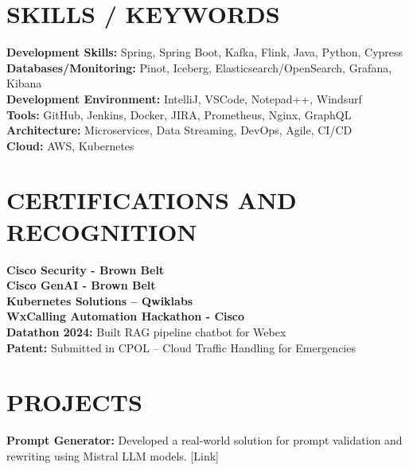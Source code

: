 \documentclass[margin,line]{resume}
\begin{document}
\begin{resume}
\section{\mysidestyle \textbf{\large{S}\small{KILLS} / \large{K}\small{EYWORDS}}}

\textbf{Development Skills:} Spring, Spring Boot, Kafka, Flink, Java, Python, Cypress\\
\textbf{Databases/Monitoring:} Pinot, Iceberg, Elasticsearch/OpenSearch, Grafana, Kibana\\
\textbf{Development Environment:} IntelliJ, VSCode, Notepad++, Windsurf\\
\textbf{Tools:} GitHub, Jenkins, Docker, JIRA, Prometheus, Nginx, GraphQL\\
\textbf{Architecture:} Microservices, Data Streaming, DevOps, Agile, CI/CD\\
\textbf{Cloud:} AWS, Kubernetes


\section{\mysidestyle \textbf{\large{C}\small{ERTIFICATIONS }\large{A}\small{ND} \large{R}\small{ECOGNITION}}}

\textbf{Cisco Security - Brown Belt} \\
\textbf{Cisco GenAI - Brown Belt} \\
\textbf{Kubernetes Solutions -- Qwiklabs} \\
\textbf{WxCalling Automation Hackathon - Cisco} \\
\textbf{Datathon 2024:} Built RAG pipeline chatbot for Webex\\
\textbf{Patent:} Submitted in CPOL -- Cloud Traffic Handling for Emergencies

\section{\mysidestyle \textbf{\large{P}\small{ROJECTS}}}

\textbf{Prompt Generator:} Developed a real-world solution for prompt validation and rewriting using Mistral LLM models. [Link]


\end{resume}
\end{document}
